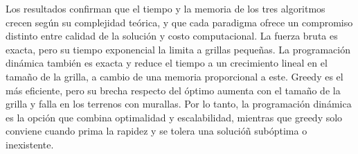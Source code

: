 Los resultados confirman que el tiempo y la memoria de los tres algoritmos crecen según su complejidad teórica, y que cada paradigma ofrece un compromiso distinto entre calidad de la solución y costo computacional. La fuerza bruta es exacta, pero su tiempo exponencial la limita a grillas pequeñas. La programación dinámica también es exacta y reduce el tiempo a un crecimiento lineal en el tamaño de la grilla, a cambio de una memoria proporcional a este. Greedy es el más eficiente, pero su brecha respecto del óptimo aumenta con el tamaño de la grilla y falla en los terrenos con murallas. Por lo tanto, la programación dinámica es la opción que combina optimalidad y escalabilidad, mientras que greedy solo conviene cuando prima la rapidez y se tolera una solucióñ subóptima o inexistente.
